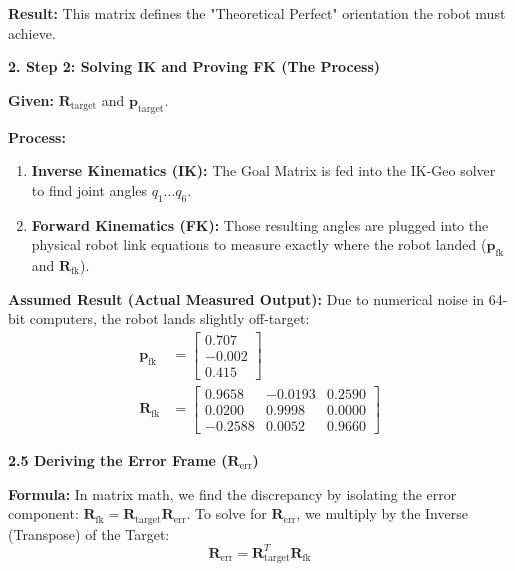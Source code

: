 \documentclass[11pt, a4paper]{article}
\begin{document}
\textbf{Result:} This matrix defines the "Theoretical Perfect" orientation the robot must achieve.

\vspace{0.3cm}
\vspace{0.3cm}
\textbf{2. Step 2: Solving IK and Proving FK (The Process)}

\textbf{Given:} $\mathbf{R}_{\text{target}}$ and $\mathbf{p}_{\text{target}}$.

\textbf{Process:}
\begin{enumerate}
    \item \textbf{Inverse Kinematics (IK):} The Goal Matrix is fed into the IK-Geo solver to find joint angles $q_1 \dots q_6$.
    \item \textbf{Forward Kinematics (FK):} Those resulting angles are plugged into the physical robot link equations to measure exactly where the robot landed ($\mathbf{p}_{\text{fk}}$ and $\mathbf{R}_{\text{fk}}$).
\end{enumerate}

\textbf{Assumed Result (Actual Measured Output):} Due to numerical noise in 64-bit computers, the robot lands slightly off-target:
\begin{align*}
    \mathbf{p}_{\text{fk}} &= \begin{bmatrix} 0.707 \\ -0.002 \\ 0.415 \end{bmatrix} \\[10pt]
    \mathbf{R}_{\text{fk}} &= \begin{bmatrix} 0.9658 & -0.0193 & 0.2590 \\ 0.0200 & 0.9998 & 0.0000 \\ -0.2588 & 0.0052 & 0.9660 \end{bmatrix}
\end{align*}

\vspace{0.3cm}
\textbf{2.5 Deriving the Error Frame ($\mathbf{R}_{\text{err}}$)}

\textbf{Formula:} In matrix math, we find the discrepancy by isolating the error component: $\mathbf{R}_{\text{fk}} = \mathbf{R}_{\text{target}} \mathbf{R}_{\text{err}}$. To solve for $\mathbf{R}_{\text{err}}$, we multiply by the Inverse (Transpose) of the Target:
\begin{equation*}
    \mathbf{R}_{\text{err}} = \mathbf{R}_{\text{target}}^T \mathbf{R}_{\text{fk}}
\end{equation*}
\end{document}
